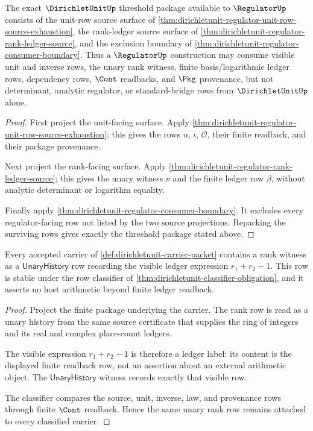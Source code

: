 \begin{theorem}
\label{thm:dirichletunit-regulator-consumer-threshold-package}
The exact $\DirichletUnitUp$ threshold package available to
$\RegulatorUp$ consists of the unit-row source surface of
\autoref{thm:dirichletunit-regulator-unit-row-source-exhaustion}, the
rank-ledger source surface of
\autoref{thm:dirichletunit-regulator-rank-ledger-source}, and the exclusion
boundary of \autoref{thm:dirichletunit-regulator-consumer-boundary}. Thus a
$\RegulatorUp$ construction may consume visible unit and inverse rows, the
unary rank witness, finite basis/logarithmic ledger rows, dependency rows,
$\Cont$ readbacks, and $\Pkg$ provenance, but not determinant, analytic
regulator, or standard-bridge rows from $\DirichletUnitUp$ alone.
\end{theorem}
\begin{proof}
First project the unit-facing surface. Apply
\autoref{thm:dirichletunit-regulator-unit-row-source-exhaustion}; this gives
the rows $u$, $\iota$, $\mathcal{O}$, their finite readback, and their package
provenance.

Next project the rank-facing surface. Apply
\autoref{thm:dirichletunit-regulator-rank-ledger-source}; this gives the
unary witness $\nu$ and the finite ledger row $\beta$, without analytic
determinant or logarithm equality.

Finally apply \autoref{thm:dirichletunit-regulator-consumer-boundary}. It
excludes every regulator-facing row not listed by the two source projections.
Repacking the surviving rows gives exactly the threshold package stated above.
\end{proof}

\begin{theorem}
\label{thm:dirichletunit-unit-rank-ledger}
Every accepted carrier of \autoref{def:dirichletunit-carrier-packet} contains a
rank witness as a $\mathsf{UnaryHistory}$ row recording the visible ledger
expression $r_1+r_2-1$. This row is stable under the row classifier of
\autoref{thm:dirichletunit-classifier-obligation}, and it asserts no host arithmetic
beyond finite ledger readback.
\end{theorem}
\begin{proof}
Project the finite package underlying the carrier. The rank row is read as a
unary history from the same source certificate that supplies the ring of
integers and its real and complex place-count ledgers.

The visible expression $r_1+r_2-1$ is therefore a ledger label: its content is
the displayed finite readback row, not an assertion about an external
arithmetic object. The $\mathsf{UnaryHistory}$ witness records exactly that
visible row.

The classifier compares the source, unit, inverse, law, and provenance rows
through finite $\Cont$ readback. Hence the same unary rank row remains attached
to every classified carrier.
\end{proof}

